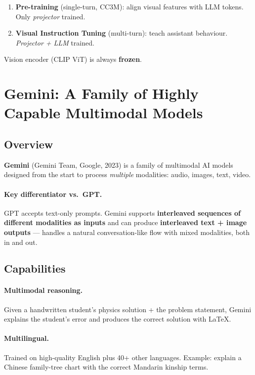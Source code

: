 \documentclass[11pt,a4paper]{article}
\theoremstyle{definition}
\theoremstyle{plain}
\theoremstyle{remark}
\begin{document}
\begin{tcolorbox}[colback=yellow!5!white, colframe=orange!80!black, title={LLaVA training summary}]
\begin{enumerate}
    \item \textbf{Pre-training} (single-turn, CC3M): align visual features with LLM tokens. Only \emph{projector} trained.
    \item \textbf{Visual Instruction Tuning} (multi-turn): teach assistant behaviour. \emph{Projector + LLM} trained.
\end{enumerate}
Vision encoder (CLIP ViT) is always \textbf{frozen}.
\end{tcolorbox}


\section{Gemini: A Family of Highly Capable Multimodal Models}

\subsection{Overview}

\textbf{Gemini} (Gemini Team, Google, 2023) is a family of multimodal AI models designed from the start to process \emph{multiple} modalities: audio, images, text, video.

\paragraph{Key differentiator vs.\ GPT.} GPT accepts text-only prompts. Gemini supports \textbf{interleaved sequences of different modalities as inputs} and can produce \textbf{interleaved text + image outputs} --- handles a natural conversation-like flow with mixed modalities, both in and out.

\subsection{Capabilities}

\paragraph{Multimodal reasoning.} Given a handwritten student's physics solution + the problem statement, Gemini explains the student's error and produces the correct solution with LaTeX.

\paragraph{Multilingual.} Trained on high-quality English plus 40+ other languages. Example: explain a Chinese family-tree chart with the correct Mandarin kinship terms.
\end{document}
